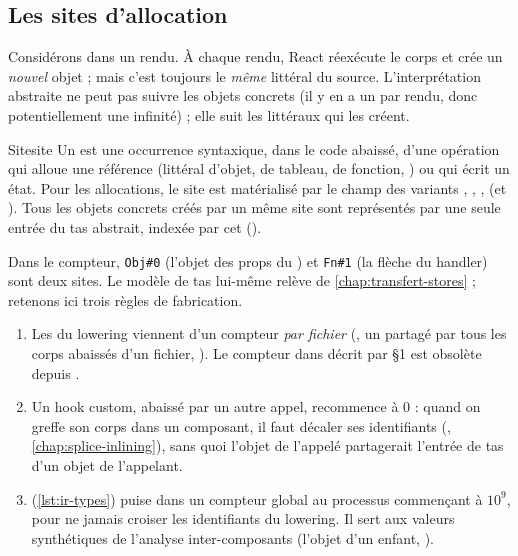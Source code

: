 \subsection{Les sites d'allocation}
\label{sec:ir-sites}

Considérons  dans un rendu. À chaque rendu, React réexécute le corps et crée un \emph{nouvel} objet ; mais c'est toujours le \emph{même} littéral du source. L'interprétation abstraite ne peut pas suivre les objets concrets (il y en a un par rendu, donc potentiellement une infinité) ; elle suit les littéraux qui les créent.

\begin{definition}{Site}{site}
Un  est une occurrence syntaxique, dans le code abaissé, d'une opération qui alloue une référence (littéral d'objet, de tableau, de fonction, ) ou qui écrit un état. Pour les allocations, le site est matérialisé par le champ  des variants , , ,  (et ). Tous les objets concrets créés par un même site sont représentés par une seule entrée du tas abstrait, indexée par cet  ().
\end{definition}

Dans le compteur, \texttt{Obj\#0} (l'objet des props du ) et \texttt{Fn\#1} (la flèche du handler) sont deux sites. Le modèle de tas lui-même relève de \cref{chap:transfert-stores} ; retenons ici trois règles de fabrication.

\begin{enumerate}
  \item Les  du lowering viennent d'un compteur \emph{par fichier} (, un  partagé par tous les corps abaissés d'un fichier, ). Le \og compteur dans \fg{} décrit par  §1 est obsolète depuis .
  \item Un hook custom, abaissé par un autre appel, recommence à 0 : quand on greffe son corps dans un composant, il faut décaler ses identifiants (, \cref{chap:splice-inlining}), sans quoi l'objet de l'appelé partagerait l'entrée de tas d'un objet de l'appelant.
  \item {} (\cref{lst:ir-types}) puise dans un compteur global au processus commençant à $10^9$, pour ne jamais croiser les identifiants du lowering. Il sert aux valeurs synthétiques de l'analyse inter-composants (l'objet  d'un enfant, ).
\end{enumerate}

